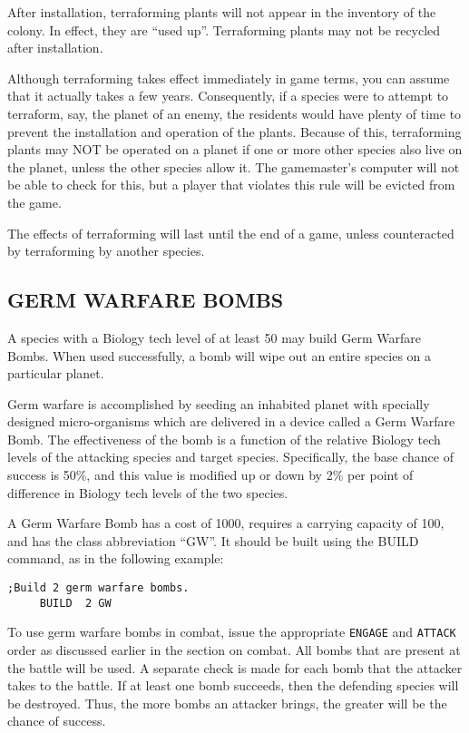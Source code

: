 \documentclass[10pt,titlepage]{article}
\begin{document}
After installation, terraforming plants will not appear in the inventory of
the colony.  In effect, they are ``used up''.  Terraforming plants may not be
recycled after installation.

Although terraforming takes effect immediately in game terms, you can assume
that it actually takes a few years.  Consequently, if a species were to attempt
to terraform, say, the planet of an enemy, the residents would have plenty of
time to prevent the installation and operation of the plants.  Because of this,
terraforming plants may NOT be operated on a planet if one or more other
species also live on the planet, unless the other species allow it.  The
gamemaster's computer will not be able to check for this, but a player
that violates this rule will be evicted from the game.

The effects of terraforming will last until the end of a game, unless
counteracted by terraforming by another species.

\newpage
\subsection{GERM WARFARE BOMBS}

A species with a Biology tech level of at least 50 may build Germ Warfare
Bombs.  When used successfully, a bomb will wipe out an entire species on a
particular planet.

Germ warfare is accomplished by seeding an inhabited planet with specially
designed micro-organisms which are delivered in a device called a Germ Warfare
Bomb.  The effectiveness of the bomb is a function of the relative Biology tech
levels of the attacking species and target species.  Specifically, the base
chance of success is 50\%, and this value is modified up or down by 2\% per point
of difference in Biology tech levels of the two species.

A Germ Warfare Bomb has a cost of 1000, requires a carrying capacity of 100,
and has the class abbreviation ``GW''.  It should be built using the BUILD
command, as in the following example:

\begin{verbatim}
;Build 2 germ warfare bombs.
     BUILD	2 GW\end{verbatim} 

To use germ warfare bombs in combat, issue the appropriate \texttt{ENGAGE} and \texttt{ATTACK}
order as discussed earlier in the section on combat.  All bombs that are
present at the battle will be used.  A separate check is made for each bomb
that the attacker takes to the battle.  If at least one bomb succeeds, then the
defending species will be destroyed.  Thus, the more bombs an attacker brings,
the greater will be the chance of success.
\end{document}
